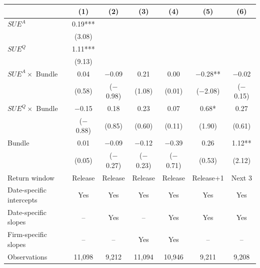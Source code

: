\begin{tabular}{lcccccc}
\toprule
 & (1) & (2) & (3) & (4) & (5) & (6)\\
\midrule
$SUE^{A}$ & 0.19*** &  &  &  &  & \\
 & (3.08) &  &  &  &  & \\[1pt]
$SUE^{Q}$ & 1.11*** &  &  &  &  & \\
 & (9.13) &  &  &  &  & \\[1pt]
$SUE^{A}\times$ Bundle & 0.04 & \ensuremath{-}0.09 & 0.21 & 0.00 & \ensuremath{-}0.28** & \ensuremath{-}0.02\\
 & (0.58) & (\ensuremath{-}0.98) & (1.08) & (0.01) & (\ensuremath{-}2.08) & (\ensuremath{-}0.15)\\[1pt]
$SUE^{Q}\times$ Bundle & \ensuremath{-}0.15 & 0.18 & 0.23 & 0.07 & 0.68* & 0.27\\
 & (\ensuremath{-}0.88) & (0.85) & (0.60) & (0.11) & (1.90) & (0.61)\\[1pt]
Bundle & 0.01 & \ensuremath{-}0.09 & \ensuremath{-}0.12 & \ensuremath{-}0.39 & 0.26 & 1.12**\\
 & (0.05) & (\ensuremath{-}0.27) & (\ensuremath{-}0.23) & (\ensuremath{-}0.71) & (0.53) & (2.12)\\[1pt]
\midrule
Return window & Release & Release & Release & Release & Release+1 & Next 3\\
Date-specific intercepts & Yes & Yes & Yes & Yes & Yes & Yes\\
Date-specific slopes & -- & Yes & -- & Yes & Yes & Yes\\
Firm-specific slopes & -- & -- & Yes & Yes & -- & --\\
Observations & 11,098 & 9,212 & 11,094 & 10,946 & 9,211 & 9,208\\
\bottomrule
\end{tabular}
